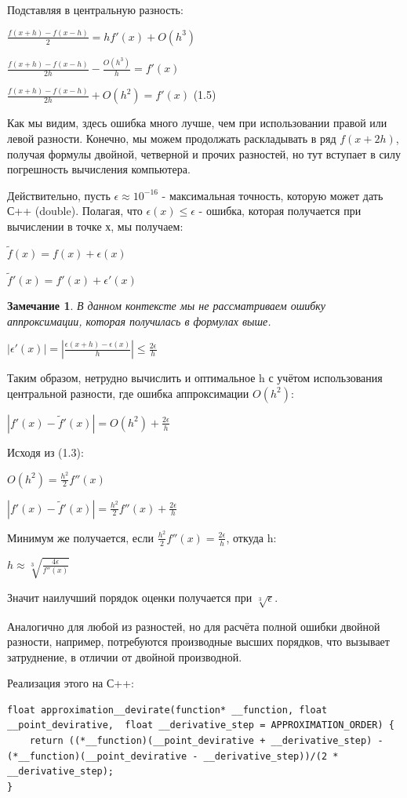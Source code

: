 \documentclass[12pt]{extarticle}
\newtheorem*{remark}{Замечание}
\begin{document}
	Подставляя в центральную разность:
	
	\centerline{$\frac{f(x+h) - f(x-h)}{2} = hf'(x) + O(h^3)$}
	\centerline{$\frac{f(x+h) - f(x-h)}{2h} -  \frac{O(h^3)}{h} = f'(x)$}
	\centerline{$\frac{f(x+h) - f(x-h)}{2h} + {O(h^2)} = f'(x)$ (1.5)}
	
	Как мы видим, здесь ошибка много лучше, чем при использовании правой или левой разности. Конечно, мы можем продолжать раскладывать в ряд $f(x+2h)$, получая формулы двойной, четверной и прочих разностей, но тут вступает в силу погрешность вычисления компьютера. 
	
	Действительно, пусть $\epsilon \approx 10^{-16}$ - максимальная точность, которую может дать С++ (double). Полагая, что $\epsilon(x)\leq\epsilon$ - ошибка, которая получается при вычислении в точке х, мы получаем:
		
	\centerline{$\tilde{f}(x) = f(x) + \epsilon(x)$}
	\centerline{$\tilde{f}'(x) = f'(x) + \epsilon'(x)$} 
	 
	 
	\begin{remark}
		В данном контексте мы не рассматриваем ошибку аппроксимации, которая получилась в формулах выше.
	\end{remark}
	\centerline{$|\epsilon'(x)| = |\frac{\epsilon(x+h) - \epsilon(x)}{h}| \leq \frac{2\epsilon}{h}$}
	
	Таким образом, нетрудно вычислить и оптимальное h с учётом использования центральной разности, где ошибка аппроксимации $O(h^2)$:
	
	\centerline{$|f'(x) - \tilde{f}'(x)| = O(h^2) + \frac{2\epsilon}{h} $}
	
	Исходя из (1.3):
	
	\centerline{$O(h^2) = \frac{h^2}{2}f''(x)$}
	\centerline{$|f'(x) - \tilde{f}'(x)| = \frac{h^2}{2}f''(x) + \frac{2\epsilon}{h} $}
	
	Минимум же получается, если $\frac{h^2}{2}f''(x) = \frac{2\epsilon}{h}$, откуда h:
	
	\centerline{$h \approx \sqrt[3]{\frac{4\epsilon}{f''(x)}}$}
	
	Значит наилучший порядок оценки получается при $\sqrt[3]{\epsilon}$.
	
	Аналогично для любой из разностей, но для расчёта полной ошибки двойной разности, например, потребуются производные высших порядков, что вызывает затруднение, в отличии от двойной производной.
	
	Реализация этого на С++:
	
	\begin{lstlisting}
float approximation__devirate(function* __function, float __point_devirative,  float __derivative_step = APPROXIMATION_ORDER) {
    return ((*__function)(__point_devirative + __derivative_step) - (*__function)(__point_devirative - __derivative_step))/(2 * __derivative_step);
}
	\end{lstlisting}
						
\end{document}
